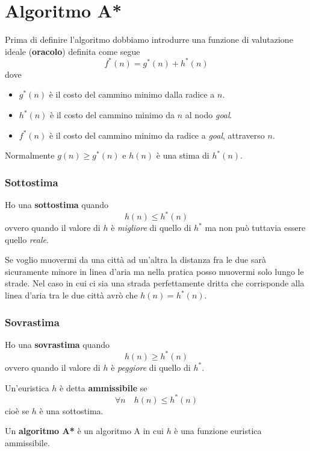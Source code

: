 \section{Algoritmo A*}
Prima di definire l'algoritmo dobbiamo introdurre una funzione di valutazione ideale 
(\textbf{oracolo}) definita come segue
\[ f^*(n) = g^*(n) + h^*(n) \]
dove
\begin{itemize}
	\item $g^*(n)$ \`e il costo del cammino minimo dalla radice a $n$.
	\item $h^*(n)$ \`e il costo del cammino minimo da $n$ al nodo \emph{goal}.
	\item $f^*(n)$ \`e il costo del cammino minimo da radice a \emph{goal}, attraverso $n$.
\end{itemize}
Normalmente $g(n) \geq g^*(n)$ e $h(n)$ \`e una stima di $h^*(n)$.

\subsubsection{Sottostima}
Ho una \textbf{sottostima} quando \[ h(n) \leq h^*(n) \] ovvero quando il valore di $h$ \`e
\emph{migliore} di quello di $h^*$ ma non pu\`o tuttavia essere quello \emph{reale}.

\begin{example}
	Se voglio muovermi da una citt\`a ad un'altra la distanza fra le due sar\`a sicuramente
	minore in linea d'aria ma nella pratica posso muovermi solo lungo le strade. Nel caso
	in cui ci sia una strada perfettamente dritta che corrisponde alla linea d'aria tra le
	due citt\`a avr\`o che $h(n) = h^*(n)$.
\end{example}

\subsubsection{Sovrastima}
Ho una \textbf{sovrastima} quando \[ h(n) \geq h^*(n) \] ovvero quando il valore di $h$ \`e
\emph{peggiore} di quello di $h^*$.

\begin{definition}
	Un'euristica $h$ \`e detta \textbf{ammissibile} se
	\[ \forall n \quad h(n) \leq h^*(n) \]
	cio\`e se $h$ \`e una sottostima.
\end{definition}

\begin{definition}
	Un \textbf{algoritmo A*} \`e un algoritmo A in cui $h$ \`e una funzione euristica
	ammissibile.
\end{definition}

